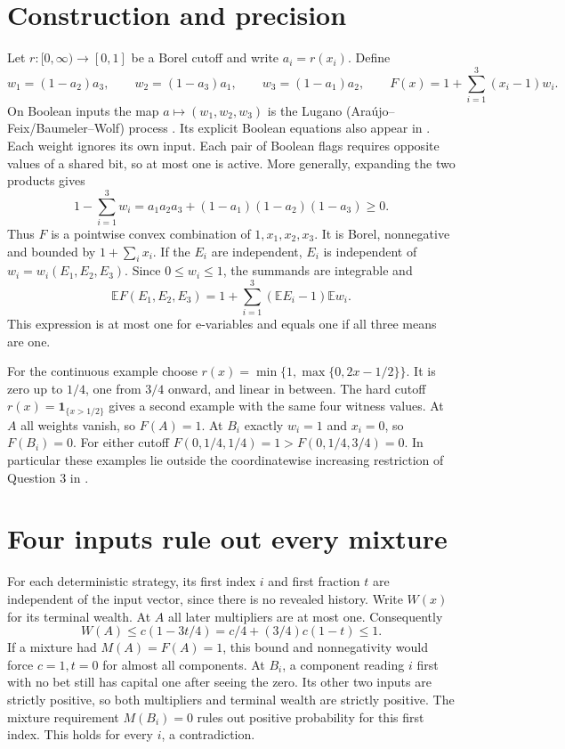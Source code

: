 \documentclass[11pt,a4paper]{amsart}
\begin{document}
\section{Construction and precision}

Let \(r:[0,\infty)\to[0,1]\) be a Borel cutoff and write
\(a_i=r(x_i)\). Define
\[
 w_1=(1-a_2)a_3,\qquad
 w_2=(1-a_3)a_1,\qquad
 w_3=(1-a_1)a_2,\qquad
 F(x)=1+\sum_{i=1}^3 (x_i-1)w_i .
\]
On Boolean inputs the map \(a\mapsto (w_1,w_2,w_3)\) is the Lugano
(Ara\'ujo--Feix/Baumeler--Wolf) process \cite[Example~4 and Table~I]{bw}.
Its explicit Boolean equations also appear in \cite[eq.~(2)]{kb}.
Each weight ignores its own input. Each pair of Boolean flags
requires opposite values of a shared bit, so at most one is active.
More generally, expanding the two products gives
\[
 1-\sum_{i=1}^3 w_i = a_1a_2a_3+(1-a_1)(1-a_2)(1-a_3)\geq0 .
\]
Thus \(F\) is a pointwise convex combination of \(1,x_1,x_2,x_3\).
It is Borel, nonnegative and bounded by \(1+\sum_i x_i\).
If the \(E_i\) are independent, \(E_i\) is independent of
\(w_i=w_i(E_1,E_2,E_3)\). Since \(0\leq w_i\leq1\), the summands
are integrable and
\[
 \mathbb E F(E_1,E_2,E_3)=
  1+\sum_{i=1}^3 (\mathbb E E_i-1)\mathbb E w_i.
\]
This expression is at most one for e-variables and equals one if
all three means are one.

For the continuous example choose
\(r(x)=\min\{1,\max\{0,2x-1/2\}\}\).
It is zero up to \(1/4\), one from \(3/4\) onward, and linear in
between. The hard cutoff \(r(x)=\mathbf{1}_{\{x>1/2\}}\) gives
a second example with the same four witness values. At \(A\) all
weights vanish, so \(F(A)=1\). At \(B_i\) exactly \(w_i=1\)
and \(x_i=0\), so \(F(B_i)=0\).
For either cutoff \(F(0,1/4,1/4)=1>F(0,1/4,3/4)=0\).
In particular these examples lie outside the coordinatewise
increasing restriction of Question 3 in \cite{vw}.

\section{Four inputs rule out every mixture}

For each deterministic strategy, its first index \(i\) and first
fraction \(t\) are independent of the input vector, since there is
no revealed history. Write \(W(x)\) for its terminal wealth.
At \(A\) all later multipliers are at most one. Consequently
\[
 W(A)\leq c(1-3t/4)=c/4+(3/4)c(1-t)\leq1 .
\]
If a mixture had \(M(A)=F(A)=1\), this bound and nonnegativity would
force \(c=1,t=0\) for almost all components. At \(B_i\), a component
reading \(i\) first with no bet still has capital one after seeing
the zero. Its other two inputs are strictly positive, so both
multipliers and terminal wealth are strictly positive. The mixture
requirement \(M(B_i)=0\) rules out positive probability for this
first index. This holds for every \(i\), a contradiction.
\end{document}
